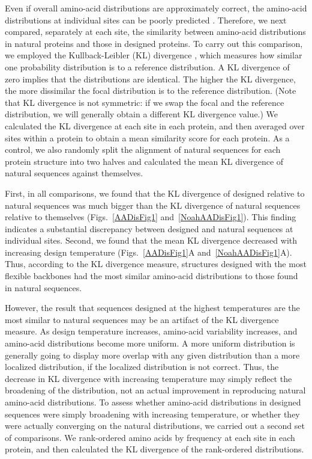 \documentclass[12pt]{article}
\begin{document}
Even if overall amino-acid distributions are approximately correct, the amino-acid distributions at individual sites can be poorly predicted \citep{Ramsey2011}. Therefore, we next compared, separately at each site, the similarity between amino-acid distributions in natural proteins and those in designed proteins. To carry out this comparison, we employed the Kullback-Leibler (KL) divergence \citep{Wasserman2004}, which measures how similar one probability distribution is to a reference distribution. A KL divergence of zero implies that the distributions are identical. The higher the KL divergence, the more dissimilar the focal distribution is to the reference distribution. (Note that KL divergence is not symmetric: if we swap the focal and the reference distribution, we will generally obtain a different KL divergence value.) We calculated the KL divergence at each site in each protein, and then averaged over sites within a protein to obtain a mean similarity score for each protein. As a control, we also randomly split the alignment of natural sequences for each protein structure into two halves and calculated the mean KL divergence of natural sequences against themselves.

First, in all comparisons, we found that the KL divergence of designed relative to natural sequences was much bigger than the KL divergence of natural sequences relative to themselves (Figs.~\ref{AADisFig1} and~\ref{NoahAADisFig1}). This finding indicates a substantial discrepancy between designed and natural sequences at individual sites. Second, we found that the mean KL divergence decreased with increasing design temperature (Figs.~\ref{AADisFig1}A and~\ref{NoahAADisFig1}A). Thus, according to the KL divergence measure, structures designed with the most flexible backbones had the most similar amino-acid distributions to those found in natural sequences.

However, the result that sequences designed at the highest temperatures are the most similar to natural sequences may be an artifact of the KL divergence measure. As design temperature increases, amino-acid variability increases, and amino-acid distributions become more uniform. A more uniform distribution is generally going to display more overlap with any given distribution than a more localized distribution, if the localized distribution is not correct. Thus, the decrease in KL divergence with increasing temperature may simply reflect the broadening of the distribution, not an actual improvement in reproducing natural amino-acid distributions. To assess whether amino-acid distributions in designed sequences were simply broadening with increasing temperature, or whether they were actually converging on the natural distributions, we carried out a second set of comparisons. We rank-ordered amino acids by frequency at each site in each protein, and then calculated the KL divergence of the rank-ordered distributions. 
\end{document}
